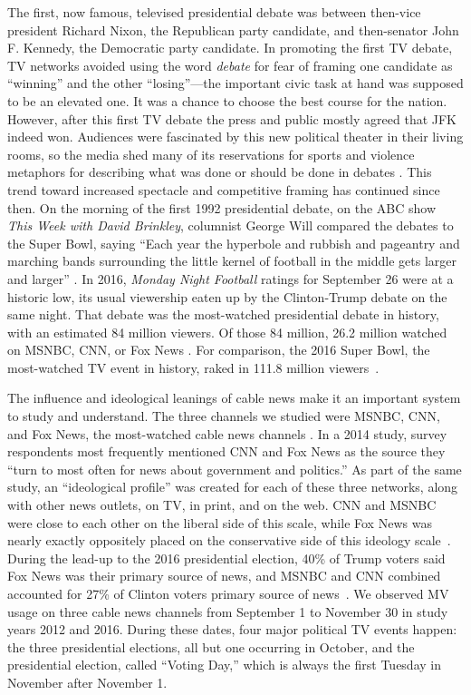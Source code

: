 The first, now famous, televised presidential debate was between then-vice president 
Richard Nixon, the Republican party candidate, and then-senator John F. Kennedy,
the Democratic party candidate. In promoting the first TV debate, TV networks avoided
using the word \emph{debate} for fear of framing one candidate as ``winning'' 
and the other ``losing''---the important civic task at hand 
was supposed to be an elevated one. 
It was a chance to choose the best course for the nation.
However, after this first TV debate the 
press and public mostly agreed that JFK indeed won. 
Audiences were fascinated by this new political theater
in their living rooms, so the media shed many of its 
reservations for sports and violence
metaphors for describing what was done or should be done in debates 
\cite[p. 99]{Schroeder2008}. This trend toward increased spectacle and 
competitive framing has continued since then. On the morning of the first
1992 presidential debate, on the ABC show \emph{This Week with David Brinkley},
columnist George Will compared the debates to the Super Bowl, 
saying ``Each year the hyperbole and rubbish and pageantry
and marching bands surrounding the little kernel of football in the middle gets
larger and larger'' \cite[p. 111]{Schroeder2008}. 
In 2016, \emph{Monday Night Football} ratings for September 26
were at a historic low, its usual viewership eaten up by the Clinton-Trump 
debate on the same night.
That debate was the most-watched presidential debate in history, with an estimated 84
million viewers. Of those 84 million, 26.2 million watched on
MSNBC, CNN, or Fox News \cite{Perlberg2016}.  For comparison, the 2016 Super Bowl, the 
most-watched TV event in history, raked in 111.8 
million viewers~\cite{Hagemann2016}.

The influence and ideological leanings of cable news make it an important 
system to study and understand.  The three channels we studied were 
MSNBC, CNN, and Fox News, the most-watched cable news channels \cite{OConnell2017}. 
In a 2014 study, survey respondents most frequently mentioned CNN and 
Fox News as the source they ``turn to most often for news about government and 
politics.'' As part of the same study, an ``ideological profile'' was created
for each of these three networks, along with other news outlets, on TV, 
in print, and on the web. 
CNN and MSNBC were close to each other on the
liberal side of this scale, while Fox News was nearly exactly oppositely 
placed on the conservative side of this ideology scale~\cite{Pew2014}.
During the lead-up to the 2016 presidential election, 40\% of Trump voters
said Fox News was their primary source of news, and MSNBC and CNN combined
accounted for 27\% of Clinton voters primary source of news~\cite{Pew2017}.
We observed MV usage on three cable news channels from 
September 1 to November 30 in study years 2012 and 2016. 
During these dates, four major political TV events happen: the 
three presidential elections, all but one occurring in October, 
and the presidential election, called ``Voting Day,'' 
which is always the first Tuesday in November after November 1.

